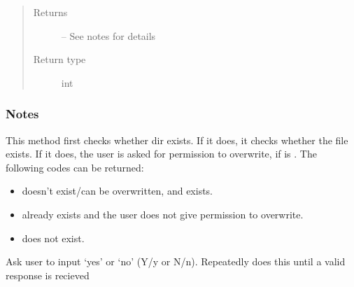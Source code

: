 \documentclass[letterpaper,10pt,english]{sphinxmanual}
\begin{document}
\begin{fulllineitems}
\begin{fulllineitems}
\begin{quote}
\begin{description}
\item[{Returns}] \leavevmode
\sphinxAtStartPar
{} – See notes for details

\item[{Return type}] \leavevmode
\sphinxAtStartPar
int

\end{description}\end{quote}
\subsubsection*{Notes}

\sphinxAtStartPar
This method first checks whether dir exists. If it does, it checks
whether the file  exists. If it does, the user is asked for
permission to overwrite, if  is . The following
codes can be returned:
\begin{itemize}
\item {} 
\sphinxAtStartPar
{}  doesn’t exist/can be overwritten, and  exists.

\item {} 
\sphinxAtStartPar
{}  already exists and the user does not give
permission to overwrite.

\item {} 
\sphinxAtStartPar
{}  does not exist.

\end{itemize}

\end{fulllineitems}


\end{fulllineitems}


\begin{fulllineitems}
\label{\detokenize{references/misc:nmrespy._misc.get_yes_no}}
\sphinxAtStartPar
Ask user to input ‘yes’ or ‘no’ (Y/y or N/n). Repeatedly does this
until a valid response is recieved

\end{fulllineitems}
\end{document}

